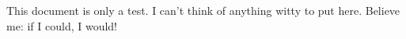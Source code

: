 \documentclass[a4paper]{article}
\begin{document}
This document is only a test.
I can't think of anything witty to put here.
Believe me: if I could, I would!
\end{document}
